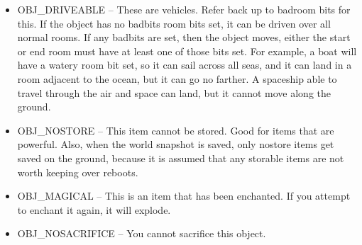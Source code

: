 \begin{itemize}
\begin{itemize}
\item OBJ\_DRIVEABLE -- These are vehicles. Refer back up to badroom
bits for this. If the object has no badbits room bits set, it can be
driven over all normal rooms. If any badbits are set, then the object
moves, either the start or end room must have at least one of those
bits set. For example, a boat will have a watery room bit set, so it
can sail across all seas, and it can land in a room adjacent to the
ocean, but it can go no farther. A spaceship able to travel through
the air and space can land, but it cannot move along the ground. 

\item OBJ\_NOSTORE -- This item cannot be stored. Good for items that
are powerful. Also, when the world snapshot is saved, only nostore
items get saved on the ground, because it is assumed that any storable
items are not worth keeping over reboots.

\item OBJ\_MAGICAL -- This is an item that has been enchanted. If you
attempt to enchant it again, it will explode.

\item OBJ\_NOSACRIFICE -- You cannot sacrifice this object.

\end{itemize}



\end{itemize}

        
